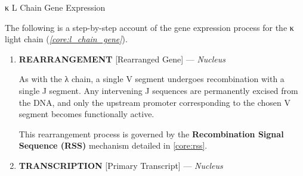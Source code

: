      \begin{core}[label=core:kl_chain_gene_expression]{κ L Chain Gene Expression}

        The following is a step-by-step account of the gene expression process for the κ light chain (\textit{\autoref{core:l_chain_gene}}).

        \begin{enumerate}[label=(\arabic*)]

          \item \textbf{REARRANGEMENT} [Rearranged Gene] --- \textit{Nucleus}


            As with the λ chain, a single V segment undergoes recombination with a single J segment. Any intervening J sequences are permanently excised from the DNA, and only the upstream promoter corresponding to the chosen V segment becomes functionally active.

            This rearrangement process is governed by the \textbf{Recombination Signal Sequence (RSS)} mechanism detailed in \autoref{core:rss}.

          \item \textbf{TRANSCRIPTION} [Primary Transcript] --- \textit{Nucleus}

\end{enumerate}
\end{core}
